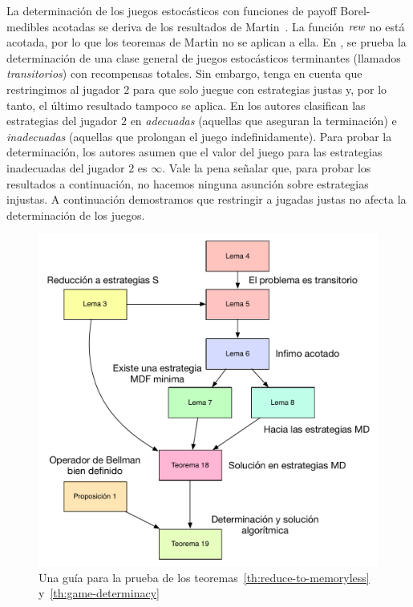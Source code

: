 La determinación de los juegos estocásticos con funciones de payoff Borel-medibles acotadas se deriva de los resultados de Martin~\cite{Martin98}. La función $\textit{rew}$ no está acotada, por lo que los teoremas de Martin no se aplican a ella. En \cite{FilarV96}, se prueba la determinación de una clase general de juegos estocásticos terminantes (llamados \emph{transitorios}) con recompensas totales. Sin embargo, tenga en cuenta que restringimos al jugador $2$ para que solo juegue con estrategias justas y, por lo tanto, el último resultado tampoco se aplica.
%
En \cite{PatekBertsekas99} los autores clasifican las estrategias del jugador $2$ en \emph{adecuadas} (aquellas que aseguran la terminación) e \emph{inadecuadas} (aquellas que prolongan el juego indefinidamente). Para probar la determinación, los autores asumen que el valor del juego para las estrategias inadecuadas del jugador $2$ es $\infty$. Vale la pena señalar que, para probar los resultados a continuación, no hacemos ninguna asunción sobre estrategias injustas.
%
A continuación demostramos que restringir a jugadas justas no afecta la determinación de los juegos.
\begin{figure}
  \centering
  \includegraphics[scale=0.5]{Figs/roadmap.pdf}
  \caption{Una guía para la prueba de los teoremas~\ref{th:reduce-to-memoryless} y~\ref{th:game-determinacy}}\label{fig:roadmap}
\end{figure}


